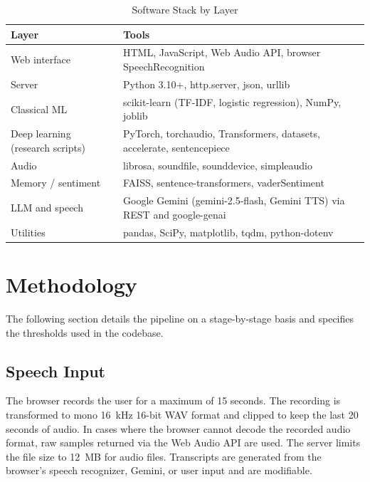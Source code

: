 \documentclass[conference]{IEEEtran}
\begin{document}
\begin{table}[htbp]
\caption{Software Stack by Layer}
\label{tab:stack}
\begin{center}
\small
\begin{tabular}{|p{2.0cm}|p{5.0cm}|}
\hline
\textbf{Layer} & \textbf{Tools} \\
\hline
Web interface & HTML, JavaScript, Web Audio API, browser SpeechRecognition \\
\hline
Server & Python 3.10+, http.server, json, urllib \\
\hline
Classical ML & scikit-learn (TF-IDF, logistic regression), NumPy, joblib \\
\hline
Deep learning (research scripts) & PyTorch, torchaudio, Transformers, datasets, accelerate, sentencepiece \\
\hline
Audio & librosa, soundfile, sounddevice, simpleaudio \\
\hline
Memory / sentiment & FAISS, sentence-transformers, vaderSentiment \\
\hline
LLM and speech & Google Gemini (gemini-2.5-flash, Gemini TTS) via REST and google-genai \\
\hline
Utilities & pandas, SciPy, matplotlib, tqdm, python-dotenv \\
\hline
\end{tabular}
\end{center}
\end{table}

\section{Methodology}
The following section details the pipeline on a stage-by-stage basis and specifies the thresholds used in the codebase.

\subsection{Speech Input}
The browser records the user for a maximum of 15 seconds. The recording is transformed to mono 16~kHz 16-bit WAV format and clipped to keep the last 20 seconds of audio. In cases where the browser cannot decode the recorded audio format, raw samples returned via the Web Audio API are used. The server limits the file size to 12~MB for audio files. Transcripts are generated from the browser's speech recognizer, Gemini, or user input and are modifiable.
\end{document}
